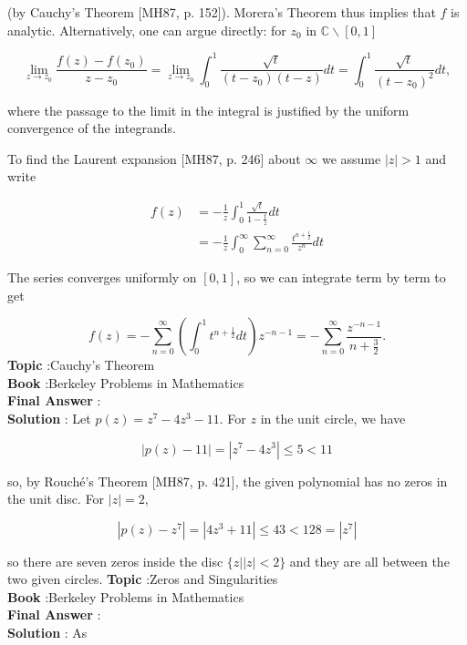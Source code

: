 \documentclass[10pt]{article}
\begin{document}
(by Cauchy's Theorem [MH87, p. 152]). Morera's Theorem thus implies that $f$ is analytic. Alternatively, one can argue directly: for $z_{0}$ in $\mathbb{C} \backslash[0,1]$

$$
\lim _{z \rightarrow z_{0}} \frac{f(z)-f\left(z_{0}\right)}{z-z_{0}}=\lim _{z \rightarrow z_{0}} \int_{0}^{1} \frac{\sqrt{t}}{\left(t-z_{0}\right)(t-z)} d t=\int_{0}^{1} \frac{\sqrt{t}}{\left(t-z_{0}\right)^{2}} d t,
$$

where the passage to the limit in the integral is justified by the uniform convergence of the integrands.

To find the Laurent expansion [MH87, p. 246] about $\infty$ we assume $|z|>1$ and write

$$
\begin{aligned}
f(z) &=-\frac{1}{z} \int_{0}^{1} \frac{\sqrt{t}}{1-\frac{t}{z}} d t \\
&=-\frac{1}{z} \int_{0}^{\infty} \sum_{n=0}^{\infty} \frac{t^{n+\frac{1}{2}}}{z^{n}} d t
\end{aligned}
$$

The series converges uniformly on $[0,1]$, so we can integrate term by term to get

$$
f(z)=-\sum_{n=0}^{\infty}\left(\int_{0}^{1} t^{n+\frac{1}{2}} d t\right) z^{-n-1}=-\sum_{n=0}^{\infty} \frac{z^{-n-1}}{n+\frac{3}{2}} .
$$
\textbf{Topic} :Cauchy's Theorem \\
\textbf{Book} :Berkeley Problems in Mathematics\\
\textbf{Final Answer} :\\


\textbf{Solution} : Let $p(z)=z^{7}-4 z^{3}-11$. For $z$ in the unit circle, we have

$$
|p(z)-11|=\left|z^{7}-4 z^{3}\right| \leqslant 5<11
$$

so, by Rouché's Theorem [MH87, p. 421], the given polynomial has no zeros in the unit disc. For $|z|=2$,

$$
\left|p(z)-z^{7}\right|=\left|4 z^{3}+11\right| \leqslant 43<128=\left|z^{7}\right|
$$

so there are seven zeros inside the disc $\{z|| z \mid<2\}$ and they are all between the two given circles.
\textbf{Topic} :Zeros and Singularities \\
\textbf{Book} :Berkeley Problems in Mathematics\\
\textbf{Final Answer} :\\


\textbf{Solution} : As
\end{document}

